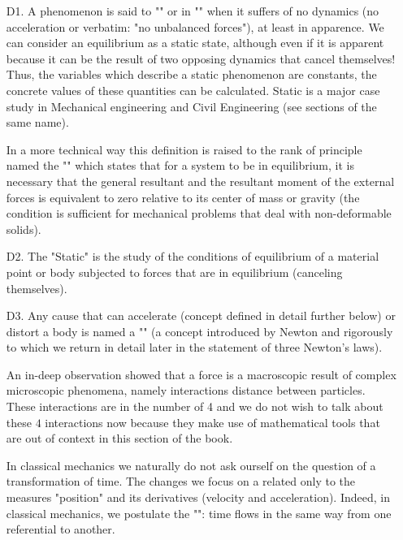 	\begin{enumerate}
		\item[D1.] A phenomenon is said to "" or in "" when it suffers of no dynamics (no acceleration or verbatim: "no unbalanced forces"), at least in apparence. We can consider an equilibrium as a static state, although even if it is apparent because it can be the result of two opposing dynamics that cancel themselves! Thus, the variables which describe a static phenomenon are constants, the concrete values of these quantities can be calculated. Static is a major case study in Mechanical engineering and Civil Engineering (see sections of the same name).
		
		In a more technical way this definition is raised to the rank of principle named the "" which states that for a system to be in equilibrium, it is necessary that the general resultant and the resultant moment of the external forces is equivalent to zero relative to its center of mass or gravity (the condition is sufficient for mechanical problems that deal with non-deformable solids).
		\item[D2.] The "Static" is the study of the conditions of equilibrium of a material point or body subjected to forces that are in equilibrium (canceling themselves).
		\item[D3.] Any cause that can accelerate (concept defined in detail further below) or distort a body is named a "" (a concept introduced by Newton and rigorously to which we return in detail later in the statement of three Newton's laws).
		
		An in-deep observation showed that a force is a macroscopic result of complex microscopic phenomena, namely interactions distance between particles. These interactions are in the number of 4 and we do not wish to talk about these $4$ interactions now because they make use of mathematical tools that are out of context in this section of the book.
		
	\begin{tcolorbox}[title=Remark,colframe=black,arc=10pt]
In classical mechanics we naturally do not ask ourself on the question of a transformation of time. The changes we focus on a related only to the measures "position" and its derivatives (velocity and acceleration). Indeed, in classical mechanics, we postulate the "": time flows in the same way from one referential to another.
	\end{tcolorbox}	
	

\end{enumerate}

